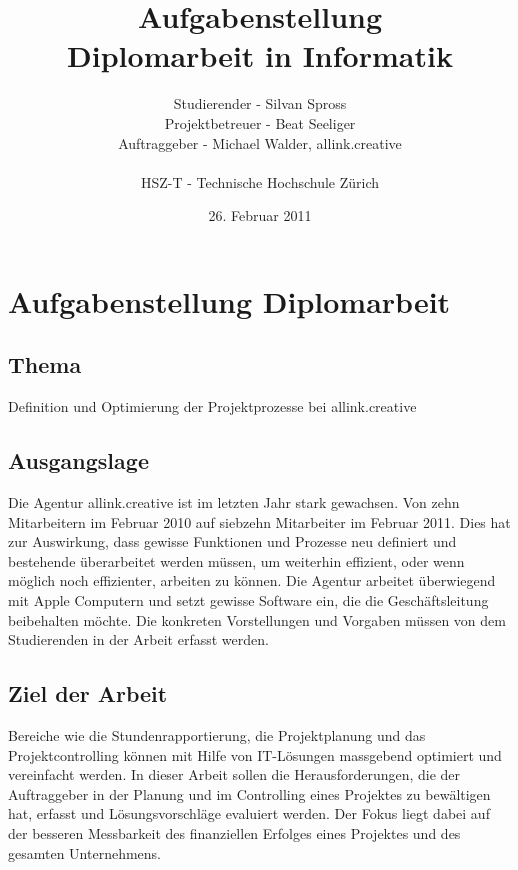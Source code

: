 \documentclass[]{scrreprt}
\title{Aufgabenstellung\\
    Diplomarbeit in Informatik}
\author{Studierender - Silvan Spross\\
    Projektbetreuer - Beat Seeliger\\
    Auftraggeber - Michael Walder, allink.creative\\
    \\
    HSZ-T - Technische Hochschule Zürich}
\date{26. Februar 2011}
\begin{document}
    \ifpdf
    \else
    \fi

    \maketitle



    \chapter{Aufgabenstellung Diplomarbeit}

    \section{Thema}
    Definition und Optimierung der Projektprozesse bei allink.creative

    \section{Ausgangslage}
    Die Agentur allink.creative ist im letzten Jahr stark gewachsen. Von zehn
    Mitarbeitern im Februar 2010 auf siebzehn Mitarbeiter im Februar 2011. Dies hat 
    zur Auswirkung, dass gewisse Funktionen und Prozesse neu definiert und bestehende
    überarbeitet werden müssen, um weiterhin effizient, oder wenn möglich noch 
    effizienter, arbeiten zu können. Die Agentur arbeitet überwiegend mit Apple
    Computern und setzt gewisse Software ein, die die Geschäftsleitung beibehalten 
    möchte. Die konkreten Vorstellungen und Vorgaben müssen von dem Studierenden
    in der Arbeit erfasst werden.

    \section{Ziel der Arbeit}
    Bereiche wie die Stundenrapportierung, die Projektplanung und das Projektcontrolling 
    können mit Hilfe von IT-Lösungen massgebend optimiert und vereinfacht werden. 
    In dieser Arbeit sollen die Herausforderungen, die der Auftraggeber in der 
    Planung und im Controlling eines Projektes zu bewältigen hat, erfasst und 
    Lösungsvorschläge evaluiert werden. Der Fokus liegt dabei auf der besseren 
    Messbarkeit des finanziellen Erfolges eines Projektes und des gesamten 
    Unternehmens.
    
\end{document}
